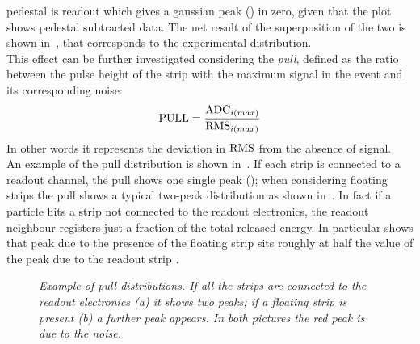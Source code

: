 pedestal is readout which gives a gaussian peak () in zero,
given that the plot shows pedestal subtracted data. The net result of the
superposition of the two is shown in~, that
corresponds to the experimental distribution.\\
This effect can be further investigated considering the {\it pull}, defined as
the ratio between the pulse height of the strip with the maximum signal in the
event and its corresponding noise:
\begin{equation}
{\rm PULL} = \frac{{\rm ADC}_{i(max)}}{{\rm RMS}_{i(max)}}
\end{equation}
In other words it represents the deviation in ${\rm RMS}$ from the absence of
signal.\\
%
%
%
An example of the pull distribution is shown in~. If each strip is
connected to a readout channel, the pull shows one single peak
(); when considering floating strips the pull shows a
typical two-peak distribution as shown in~. In fact if a
particle hits a strip not connected to the readout electronics, the readout
neighbour registers just a fraction of the total released energy. In particular
 shows that peak due to the presence of the floating strip sits roughly at
{\color{red} half the value} of the peak due to the readout strip {\color{red}\cite{}}.
\begin{figure}[!htbp]
 \caption{\it \color{red} Example of pull distributions. If all the strips are connected to
   the readout electronics (a) it shows two peaks; if a floating strip is
   present (b) a further peak appears. In both pictures the red peak is due to
   the noise.}\label{fig:pull}
\end{figure}
